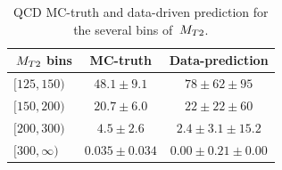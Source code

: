 \begin{linenomath}
\begin{table}[h]
\begin{center}
\small
\begin{tabular}{l|cc}\hline\hline
$\,{M_{T2}}$ bins & MC-truth & Data-prediction \\ \hline
$[125, 150)$	&	$48.1\pm9.1$		& $78\pm62\pm95$ \\
$[150, 200)$	&	$20.7\pm6.0$		& $22\pm22\pm60$ \\
$[200, 300)$	&	$4.5\pm2.6$		& $2.4\pm3.1\pm15.2$ \\
$[300, \infty)$	&	$0.035\pm0.034$	& $0.00\pm0.21\pm0.00$ \\ \hline\hline
\end{tabular}
\caption{QCD MC-truth and data-driven prediction for the several bins of $\,{M_{T2}}$.}
\label{tab:exp_distribution}
\end{center}
\end{table}
\end{linenomath}






